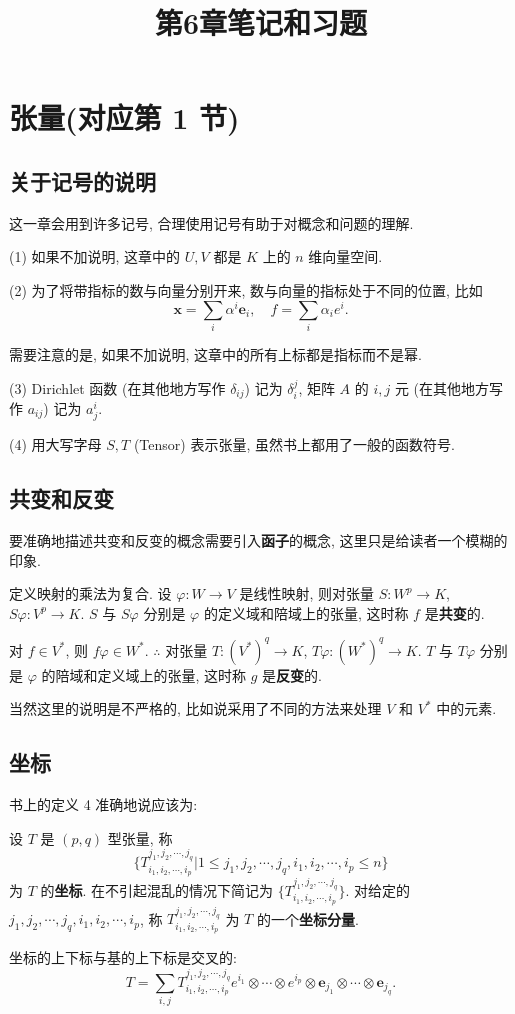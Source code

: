 \documentclass[color=black,device=normal,lang=cn,mode=geye]{elegantnote}
\title{第6章笔记和习题}
\begin{document}
\maketitle
\section{张量(对应第 1 节)}
\subsection{关于记号的说明}
这一章会用到许多记号, 合理使用记号有助于对概念和问题的理解.

(1) 如果不加说明, 这章中的 $U,V$ 都是 $K$ 上的 $n$ 维向量空间.

(2) 为了将带指标的数与向量分别开来, 数与向量的指标处于不同的位置, 比如
\[\boldsymbol{x}=\sum\limits_i\alpha^i\boldsymbol{e}_i,\quad f=\sum\limits_i\alpha_ie^i.\]

需要注意的是, 如果不加说明, 这章中的所有上标都是指标而不是幂.

(3) Dirichlet 函数 (在其他地方写作 $\delta_{ij}$) 记为 $\delta_i^j$, 矩阵 $A$ 的 $i,j$ 元 (在其他地方写作 $a_{ij}$) 记为 $a_j^i$.

(4) 用大写字母 $S,T$ (Tensor) 表示张量, 虽然书上都用了一般的函数符号.
\subsection{共变和反变}
要准确地描述共变和反变的概念需要引入\textbf{函子}的概念, 这里只是给读者一个模糊的印象.

定义映射的乘法为复合. 设 $\varphi:W\to V$ 是线性映射, 则对张量 $S:W^p\to K$, $S\varphi:V^p\to K$. $S$ 与 $S\varphi$ 分别是 $\varphi$ 的定义域和陪域上的张量, 这时称 $f$ 是\textbf{共变}的.

对 $f\in V^*$, 则 $f\varphi\in W^*$. $\therefore$ 对张量 $T:(V^*)^q\to K$, $T\varphi:(W^*)^q\to K$. $T$ 与 $T\varphi$ 分别是 $\varphi$ 的陪域和定义域上的张量, 这时称 $g$ 是\textbf{反变}的.

当然这里的说明是不严格的, 比如说采用了不同的方法来处理 $V$ 和 $V^*$ 中的元素.
\subsection{坐标}
书上的定义 4 准确地说应该为:
\begin{definition}
    设 $T$ 是 $(p,q)$ 型张量, 称
    \[\{T^{j_1,j_2,\cdots,j_q}_{i_1,i_2,\cdots,i_p}|1\leq j_1,j_2,\cdots,j_q,i_1,i_2,\cdots,i_p\leq n\}\]
    为 $T$ 的\textbf{坐标}. 在不引起混乱的情况下简记为 $\{T^{j_1,j_2,\cdots,j_q}_{i_1,i_2,\cdots,i_p}\}$. 对给定的 $j_1,j_2,\cdots,j_q,i_1,i_2,\cdots,i_p$, 称 $T^{j_1,j_2,\cdots,j_q}_{i_1,i_2,\cdots,i_p}$ 为 $T$ 的一个\textbf{坐标分量}.
\end{definition}
坐标的上下标与基的上下标是交叉的:
\[T=\sum\limits_{i,j}T^{j_1,j_2,\cdots,j_q}_{i_1,i_2,\cdots,i_p}e^{i_1}\otimes\cdots\otimes e^{i_p}\otimes\boldsymbol{e}_{j_1}\otimes\cdots\otimes\boldsymbol{e}_{j_q}.\]
\end{document}
